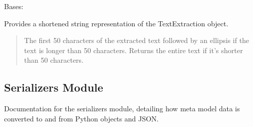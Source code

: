 \documentclass[letterpaper,10pt,english]{sphinxmanual}
\begin{document}
\begin{fulllineitems}
\begin{fulllineitems}
\end{fulllineitems}


\begin{fulllineitems}
\label{\detokenize{source/meta_models_management:meta_models_management.models.TextExtraction.MultipleObjectsReturned}}
\pysigstartsignatures
{}
\pysigstopsignatures
\sphinxAtStartPar
Bases: 

\end{fulllineitems}


\begin{fulllineitems}
\label{\detokenize{source/meta_models_management:meta_models_management.models.TextExtraction.__str__}}
\pysigstartsignatures
{}
\pysigstopsignatures
\sphinxAtStartPar
Provides a shortened string representation of the TextExtraction object.
\begin{quote}\begin{description}
\sphinxAtStartPar
{} \textendash{} The first 50 characters of the extracted text followed by an ellipsis if the text is longer than 50 characters.
Returns the entire text if it’s shorter than 50 characters.

\end{description}\end{quote}

\end{fulllineitems}


\end{fulllineitems}



\subsection{Serializers Module}
\label{\detokenize{source/meta_models_management:serializers-module}}
\sphinxAtStartPar
Documentation for the serializers module, detailing how meta model data is converted to and from Python objects and JSON.
\label{\detokenize{source/meta_models_management:module-meta_models_management.serializers}}
\end{document}
